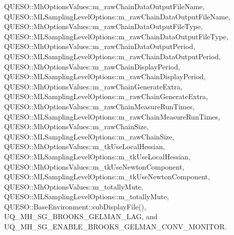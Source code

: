 Q\-U\-E\-S\-O\-::\-Mh\-Options\-Values\-::m\-\_\-raw\-Chain\-Data\-Output\-File\-Name, Q\-U\-E\-S\-O\-::\-M\-L\-Sampling\-Level\-Options\-::m\-\_\-raw\-Chain\-Data\-Output\-File\-Name, Q\-U\-E\-S\-O\-::\-Mh\-Options\-Values\-::m\-\_\-raw\-Chain\-Data\-Output\-File\-Type, Q\-U\-E\-S\-O\-::\-M\-L\-Sampling\-Level\-Options\-::m\-\_\-raw\-Chain\-Data\-Output\-File\-Type, Q\-U\-E\-S\-O\-::\-Mh\-Options\-Values\-::m\-\_\-raw\-Chain\-Data\-Output\-Period, Q\-U\-E\-S\-O\-::\-M\-L\-Sampling\-Level\-Options\-::m\-\_\-raw\-Chain\-Data\-Output\-Period, Q\-U\-E\-S\-O\-::\-Mh\-Options\-Values\-::m\-\_\-raw\-Chain\-Display\-Period, Q\-U\-E\-S\-O\-::\-M\-L\-Sampling\-Level\-Options\-::m\-\_\-raw\-Chain\-Display\-Period, Q\-U\-E\-S\-O\-::\-Mh\-Options\-Values\-::m\-\_\-raw\-Chain\-Generate\-Extra, Q\-U\-E\-S\-O\-::\-M\-L\-Sampling\-Level\-Options\-::m\-\_\-raw\-Chain\-Generate\-Extra, Q\-U\-E\-S\-O\-::\-Mh\-Options\-Values\-::m\-\_\-raw\-Chain\-Measure\-Run\-Times, Q\-U\-E\-S\-O\-::\-M\-L\-Sampling\-Level\-Options\-::m\-\_\-raw\-Chain\-Measure\-Run\-Times, Q\-U\-E\-S\-O\-::\-Mh\-Options\-Values\-::m\-\_\-raw\-Chain\-Size, Q\-U\-E\-S\-O\-::\-M\-L\-Sampling\-Level\-Options\-::m\-\_\-raw\-Chain\-Size, Q\-U\-E\-S\-O\-::\-Mh\-Options\-Values\-::m\-\_\-tk\-Use\-Local\-Hessian, Q\-U\-E\-S\-O\-::\-M\-L\-Sampling\-Level\-Options\-::m\-\_\-tk\-Use\-Local\-Hessian, Q\-U\-E\-S\-O\-::\-Mh\-Options\-Values\-::m\-\_\-tk\-Use\-Newton\-Component, Q\-U\-E\-S\-O\-::\-M\-L\-Sampling\-Level\-Options\-::m\-\_\-tk\-Use\-Newton\-Component, Q\-U\-E\-S\-O\-::\-Mh\-Options\-Values\-::m\-\_\-totally\-Mute, Q\-U\-E\-S\-O\-::\-M\-L\-Sampling\-Level\-Options\-::m\-\_\-totally\-Mute, Q\-U\-E\-S\-O\-::\-Base\-Environment\-::sub\-Display\-File(), U\-Q\-\_\-\-M\-H\-\_\-\-S\-G\-\_\-\-B\-R\-O\-O\-K\-S\-\_\-\-G\-E\-L\-M\-A\-N\-\_\-\-L\-A\-G, and U\-Q\-\_\-\-M\-H\-\_\-\-S\-G\-\_\-\-E\-N\-A\-B\-L\-E\-\_\-\-B\-R\-O\-O\-K\-S\-\_\-\-G\-E\-L\-M\-A\-N\-\_\-\-C\-O\-N\-V\-\_\-\-M\-O\-N\-I\-T\-O\-R.


